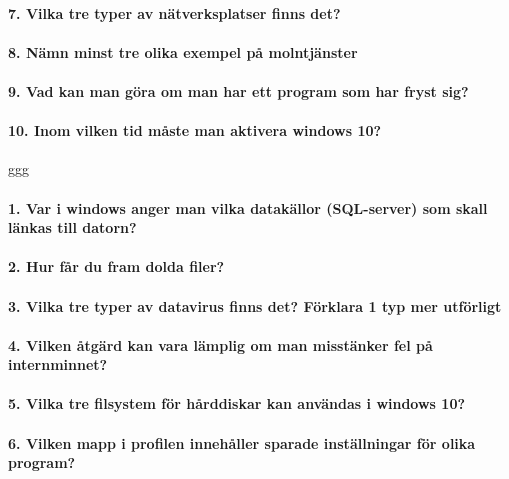 \paragraph{7. Vilka tre typer av nätverksplatser finns det?}

\paragraph{8. Nämn minst tre olika exempel på molntjänster}

\paragraph{9. Vad kan man göra om man har ett program som har fryst sig?}

\paragraph{10. Inom vilken tid måste man aktivera windows 10?}
ggg

\dotfill

\paragraph{1. Var i windows anger man vilka datakällor (SQL-server) som skall länkas till datorn?}

\paragraph{2. Hur får du fram dolda filer?}

\paragraph{3. Vilka tre typer av datavirus finns det? Förklara 1 typ mer utförligt}

\paragraph{4. Vilken åtgärd kan vara lämplig om man misstänker fel på internminnet?}

\paragraph{5. Vilka tre filsystem för hårddiskar kan användas i windows 10?}

\paragraph{6. Vilken mapp i profilen innehåller sparade inställningar för olika program?}

